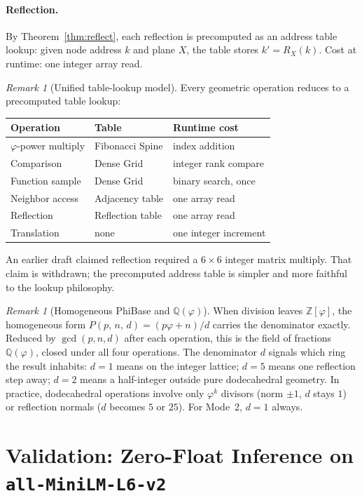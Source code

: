 \documentclass[12pt]{article}
\theoremstyle{definition}
\theoremstyle{remark}
\newtheorem{remark}[theorem]{Remark}
\newcommand{\Zphi}{\mathbb{Z}[\varphi]}
\newcommand{\Qphi}{\mathbb{Q}(\varphi)}
\newcommand{\Phibd}[3]{P(#1,\,#2,\,#3)}
\begin{document}
\paragraph{Reflection.}
By Theorem~\ref{thm:reflect}, each reflection is precomputed as an
address table lookup: given node address $k$ and plane $X$, the table
stores $k'=R_X(k)$.  Cost at runtime: one integer array read.
\begin{remark}[Unified table-lookup model]
Every geometric operation reduces to a precomputed table lookup:
\begin{center}
\renewcommand{\arraystretch}{1.2}
\begin{tabular}{lll}
\toprule
Operation & Table & Runtime cost \\
\midrule
$\varphi$-power multiply & Fibonacci Spine & index addition \\
Comparison   & Dense Grid    & integer rank compare \\
Function sample & Dense Grid & binary search, once \\
Neighbor access & Adjacency table & one array read \\
Reflection   & Reflection table & one array read \\
Translation  & none & one integer increment \\
\bottomrule
\end{tabular}
\end{center}
An earlier draft claimed reflection required a $6\times6$ integer
matrix multiply.  That claim is withdrawn; the precomputed address
table is simpler and more faithful to the lookup philosophy.
\end{remark}
\begin{remark}[Homogeneous PhiBase and $\Qphi$]
\label{rem:homogeneous}
When division leaves $\Zphi$, the homogeneous form
$\Phibd{p}{n}{d}=(p\varphi+n)/d$ carries the denominator exactly.
Reduced by $\gcd(p,n,d)$ after each operation, this is the field of
fractions $\Qphi$, closed under all four operations.  The denominator
$d$ signals which ring the result inhabits: $d=1$ means on the integer
lattice; $d=5$ means one reflection step away; $d=2$ means a
half-integer outside pure dodecahedral geometry.  In practice,
dodecahedral operations involve only $\varphi^k$ divisors (norm $\pm1$,
$d$ stays $1$) or reflection normals ($d$ becomes $5$ or $25$).
For Mode~2, $d=1$ always.
\end{remark}
\section{Validation: Zero-Float Inference on \texttt{all-MiniLM-L6-v2}}
\label{sec:bert}
\end{document}
